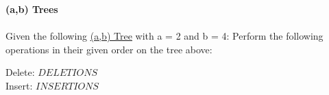 \textbf{\LARGE{\color{tumgadRed}(a,b) Trees}}\\
\\
\noindent
Given the following \href{https://sebastianoner.github.io/TUMGAD/src/DataStructures/SearchStructures/ABTrees/ABLTrees}{\underline{(a,b) Tree}} with a = 2 and b = 4:
Perform the following operations in their given order on the tree above:
\begin{center}
    Delete: $DELETIONS$\\
    Insert: $INSERTIONS$\\
\end{center}
